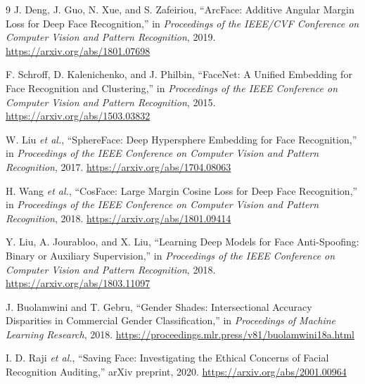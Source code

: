 \documentclass[conference]{IEEEtran}
\begin{document}
\begin{thebibliography}{9}
 J. Deng, J. Guo, N. Xue, and S. Zafeiriou, ``ArcFace: Additive Angular Margin Loss for Deep Face Recognition,'' in \emph{Proceedings of the IEEE/CVF Conference on Computer Vision and Pattern Recognition}, 2019. \url{https://arxiv.org/abs/1801.07698}

 F. Schroff, D. Kalenichenko, and J. Philbin, ``FaceNet: A Unified Embedding for Face Recognition and Clustering,'' in \emph{Proceedings of the IEEE Conference on Computer Vision and Pattern Recognition}, 2015. \url{https://arxiv.org/abs/1503.03832}

 W. Liu \emph{et al.}, ``SphereFace: Deep Hypersphere Embedding for Face Recognition,'' in \emph{Proceedings of the IEEE Conference on Computer Vision and Pattern Recognition}, 2017. \url{https://arxiv.org/abs/1704.08063}

 H. Wang \emph{et al.}, ``CosFace: Large Margin Cosine Loss for Deep Face Recognition,'' in \emph{Proceedings of the IEEE Conference on Computer Vision and Pattern Recognition}, 2018. \url{https://arxiv.org/abs/1801.09414}

 Y. Liu, A. Jourabloo, and X. Liu, ``Learning Deep Models for Face Anti-Spoofing: Binary or Auxiliary Supervision,'' in \emph{Proceedings of the IEEE Conference on Computer Vision and Pattern Recognition}, 2018. \url{https://arxiv.org/abs/1803.11097}

 J. Buolamwini and T. Gebru, ``Gender Shades: Intersectional Accuracy Disparities in Commercial Gender Classification,'' in \emph{Proceedings of Machine Learning Research}, 2018. \url{https://proceedings.mlr.press/v81/buolamwini18a.html}

 I. D. Raji \emph{et al.}, ``Saving Face: Investigating the Ethical Concerns of Facial Recognition Auditing,'' arXiv preprint, 2020. \url{https://arxiv.org/abs/2001.00964}
\end{thebibliography}
\end{document}
